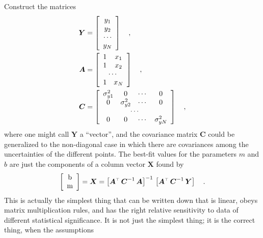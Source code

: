\documentclass[12pt,twoside,pdftex]{article}
\newcommand{\mmatrix}[1]{\boldsymbol{#1}}
\newcommand{\inverse}[1]{{#1}^{-1}}
\newcommand{\transpose}[1]{{#1}^{\scriptscriptstyle \top}}
\newcommand{\mA}{\mmatrix{A}}
\newcommand{\mAT}{\transpose{\mA}}
\newcommand{\mC}{\mmatrix{C}}
\newcommand{\mCinv}{\inverse{\mC}}
\newcommand{\mX}{\mmatrix{X}}
\newcommand{\mY}{\mmatrix{Y}}
\begin{document}
Construct the matrices
\begin{align}\label{eq:mY}
\mY &= \left[\begin{array}{c}
y_1 \\
y_2 \\
\cdots \\
y_N
\end{array}\right] \quad ,\\
\mA &= \left[\begin{array}{cc}
1 & x_1 \\
1 & x_2 \\
\multicolumn{2}{c}{\cdots} \\
1 & x_N
\end{array}\right] \quad ,\\
\mC & = \left[\begin{array}{cccc}
\sigma_{y1}^{2} & 0 & \cdots & 0 \\
0 & \sigma_{y2}^{2} & \cdots & 0 \\
\multicolumn{4}{c}{\cdots} \\
0 & 0 & \cdots & \sigma_{yN}^{2}
\end{array}\right] \quad ,\label{eq:covar}
\end{align}
where one might call $\mY$ a ``vector'', and the covariance matrix
$\mC$ could be generalized to the non-diagonal case in which there are
covariances among the uncertainties of the different points.  The
best-fit values for the parameters $m$ and $b$ are just the components
of a column vector $\mX$ found by
\begin{equation}\label{eq:lsf}
\left[\begin{array}{c} $b$ \\ $m$ \end{array}\right]
 = \mX = \inverse{\left[\mAT\,\mCinv\,\mA\right]}
  \,\left[\mAT\,\mCinv\,\mY\right] \quad .
\end{equation}
This is actually the simplest thing that can be written down that is
linear, obeys matrix multiplication rules, and has the right relative
sensitivity to data of different statistical significance.  It is not
just the simplest thing; it is the correct thing, when the assumptions
\end{document}
